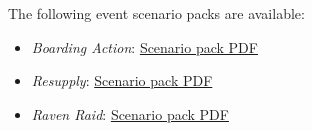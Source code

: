 The following event scenario packs are available:

\begin{itemize}

\item \emph{Boarding Action}: \href{https://raw.githubusercontent.com/Eudicods/outworlds-wastes/rules-pdf/boarding-action.pdf}{Scenario pack PDF}

\item \emph{Resupply}: \href{https://raw.githubusercontent.com/Eudicods/outworlds-wastes/rules-pdf/resupply.pdf}{Scenario pack PDF}

\item \emph{Raven Raid}: \href{https://raw.githubusercontent.com/Eudicods/outworlds-wastes/rules-pdf/raven-raid.pdf}{Scenario pack PDF}

\end{itemize}
